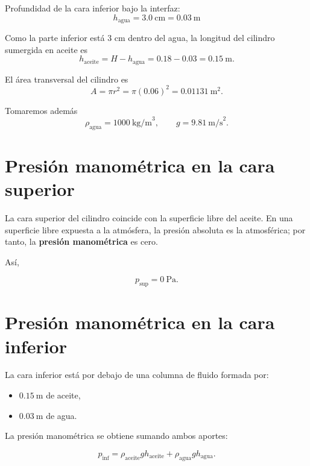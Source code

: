 \documentclass[
  letterpaper,
  DIV=11,
  numbers=noendperiod]{scrreprt}
\providecommand{\tightlist}{%
  \setlength{\itemsep}{0pt}\setlength{\parskip}{0pt}}
\begin{document}
Profundidad de la cara inferior bajo la interfaz: \[
h_{\text{agua}}=3.0\ \text{cm}=0.03\ \text{m}
\]

Como la parte inferior está 3 cm dentro del agua, la longitud del
cilindro sumergida en aceite es \[
h_{\text{aceite}}=H-h_{\text{agua}}=0.18-0.03=0.15\ \text{m}.
\]

El área transversal del cilindro es \[
A=\pi r^2=\pi(0.06)^2=0.01131\ \text{m}^2.
\]

Tomaremos además \[
\rho_{\text{agua}}=1000\ \text{kg/m}^3,
\qquad
g=9.81\ \text{m/s}^2.
\]

\section*{Presión manométrica en la cara
superior}\label{presiuxf3n-manomuxe9trica-en-la-cara-superior}


La cara superior del cilindro coincide con la superficie libre del
aceite. En una superficie libre expuesta a la atmósfera, la presión
absoluta es la atmosférica; por tanto, la \textbf{presión manométrica}
es cero.

Así,

\[
\boxed{p_{\text{sup}}=0\ \text{Pa}}.
\]

\section*{Presión manométrica en la cara
inferior}\label{presiuxf3n-manomuxe9trica-en-la-cara-inferior}


La cara inferior está por debajo de una columna de fluido formada por:

\begin{itemize}
\tightlist
\item
  \(0.15\ \text{m}\) de aceite,
\item
  \(0.03\ \text{m}\) de agua.
\end{itemize}

La presión manométrica se obtiene sumando ambos aportes:

\[
p_{\text{inf}}
=
\rho_{\text{aceite}}gh_{\text{aceite}}
+
\rho_{\text{agua}}gh_{\text{agua}}.
\]
\end{document}
